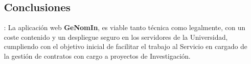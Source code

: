 \subsection{Conclusiones}: La aplicación web \textbf{GeNomIn}, es viable tanto técnica como legalmente, con un coste contenido y un despliegue seguro en los servidores de la Universidad, cumpliendo con el objetivo inicial de facilitar el trabajo al Servicio en cargado de la gestión de contratos con cargo a proyectos de Investigación.

